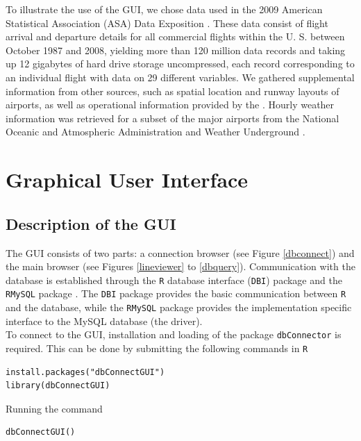 \documentclass[11pt]{tise_style}
\begin{document}
To illustrate the use of the GUI, we chose data used in the 2009 American Statistical
Association (ASA) Data Exposition \citep{dataexpo, dataexpourl}. These data consist of flight arrival and departure details for all commercial flights within the U.\! S.\! between October 1987 and 2008, yielding more than 120 million data records and taking up 12 gigabytes of hard drive storage uncompressed, each record corresponding to an individual flight with data on 29 different variables. 
We gathered supplemental information from other sources, such as spatial location and runway layouts of airports, as well as operational information provided by the \citet{faa}. Hourly weather information was retrieved for a subset of the major airports from the National Oceanic and Atmospheric Administration \citep{noaa} and Weather Underground \citep{wunderground}. 


\section{{Graphical User Interface}}

\subsection{Description of the GUI}

The GUI consists of two parts: a connection browser (see Figure \ref{dbconnect}) and the main
browser (see Figures \ref{lineviewer}  to \ref{dbquery}). Communication with the database is established through the {\tt R} database interface ({\tt DBI}) package \citep{dbi} and the {\tt RMySQL} package \citep{rmysql}. The  {\tt DBI}  package provides the basic  communication between {\tt R} and the database, while the {\tt RMySQL} package provides the implementation specific interface to the MySQL database (the driver).\\
To connect to the GUI, installation and loading of the package {\tt dbConnector} is required. This can be done by submitting the following commands in {\tt R}
\vspace{-0.5cm}
\begin{verbatim}
install.packages("dbConnectGUI")
library(dbConnectGUI)
\end{verbatim} \vspace{-0.5cm}

Running the command \vspace{-0.5cm}
\begin{verbatim}
dbConnectGUI()
\end{verbatim} \vspace{-0.5cm}
\end{document}
